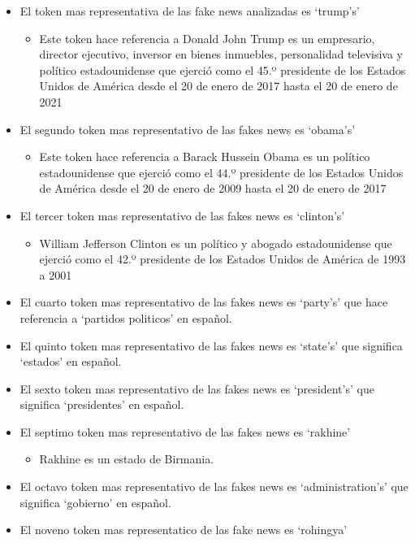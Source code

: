 \documentclass[
  11pt,
  a4paper,
]{article}
\providecommand{\tightlist}{%
  \setlength{\itemsep}{0pt}\setlength{\parskip}{0pt}}
\begin{document}
\begin{itemize}
\item
  El token mas representativa de las fake news analizadas es `trump's'

  \begin{itemize}
  \tightlist
  \item
    Este token hace referencia a Donald John Trump es un empresario,
    director ejecutivo, inversor en bienes inmuebles, personalidad
    televisiva y político estadounidense que ejerció como el 45.º
    presidente de los Estados Unidos de América desde el 20 de enero de
    2017 hasta el 20 de enero de 2021
  \end{itemize}
\item
  El segundo token mas representativo de las fakes news es `obama's'

  \begin{itemize}
  \tightlist
  \item
    Este token hace referencia a Barack Hussein Obama es un político
    estadounidense que ejerció como el 44.º presidente de los Estados
    Unidos de América desde el 20 de enero de 2009 hasta el 20 de enero
    de 2017
  \end{itemize}
\item
  El tercer token mas representativo de las fakes news es `clinton's'

  \begin{itemize}
  \tightlist
  \item
    William Jefferson Clinton es un político y abogado estadounidense
    que ejerció como el 42.º presidente de los Estados Unidos de América
    de 1993 a 2001
  \end{itemize}
\item
  El cuarto token mas representativo de las fakes news es `party's' que
  hace referencia a `partidos politicos' en español.
\item
  El quinto token mas representativo de las fakes news es `state's' que
  significa `estados' en español.
\item
  El sexto token mas representativo de las fakes news es `president's'
  que significa `presidentes' en español.
\item
  El septimo token mas representativo de las fakes news es `rakhine'

  \begin{itemize}
  \tightlist
  \item
    Rakhine es un estado de Birmania.
  \end{itemize}
\item
  El octavo token mas representativo de las fakes news es
  `administration's' que significa `gobierno' en español.
\item
  El noveno token mas representatico de las fake news es `rohingya'


\end{itemize}
\end{document}
